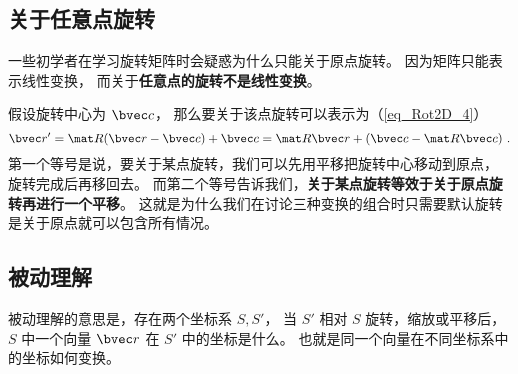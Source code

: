 \subsection{关于任意点旋转}
一些初学者在学习旋转矩阵时会疑惑为什么只能关于原点旋转。 因为矩阵只能表示线性变换， 而关于\textbf{任意点的旋转不是线性变换}。

假设旋转中心为 $\bvec c$， 那么要关于该点旋转可以表示为（\autoref{eq_Rot2D_4}）
\begin{equation}
\bvec r' = \mat R(\bvec r-\bvec c) + \bvec c = \mat R\bvec r + (\bvec c-\mat R\bvec c)~.
\end{equation}
第一个等号是说，要关于某点旋转，我们可以先用平移把旋转中心移动到原点， 旋转完成后再移回去。 而第二个等号告诉我们，\textbf{关于某点旋转等效于关于原点旋转再进行一个平移}。 这就是为什么我们在讨论三种变换的组合时只需要默认旋转是关于原点就可以包含所有情况。

\subsection{被动理解}
被动理解的意思是，存在两个坐标系 $S,S'$， 当 $S'$ 相对 $S$ 旋转，缩放或平移后， $S$ 中一个向量 $\bvec r$ 在 $S'$ 中的坐标是什么。 也就是同一个向量在不同坐标系中的坐标如何变换。


